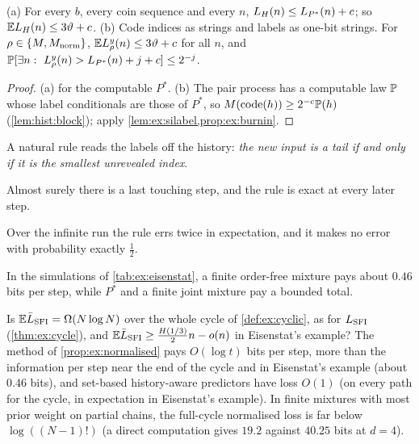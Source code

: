 \begin{theorem}\label{thm:ex:eisensi}
(a) For every $b$, every coin sequence and every $n$, $L_{H}(n)\le L_{P^*}(n)+c$; so $\mathbb{E}L_{H}(n)\le3\vartheta+c$.
(b) Code indices as strings and labels as one-bit strings. For $\rho\in\{M,M_{\mathrm{norm}}\}$, $\mathbb{E} L^y_\rho(n)\le3\vartheta+c$ for all $n$, and $\Prob[\exists n:\ L^y_\rho(n)>L_{P^*}(n)+j+c]\le2^{-j}$.
\end{theorem}

\begin{proof}
(a)  for the computable $P^*$. (b) The pair process has a computable law $\mathbb{P}$ whose label conditionals are those of $P^*$, so $M(\operatorname{code}(h))\ge2^{-c}\mathbb{P}(h)$ (\cref{lem:hist:block}); apply \cref{lem:ex:silabel,prop:ex:burnin}.
\end{proof}

A natural rule reads the labels off the history: \emph{the new input is a tail if and only if it is the smallest unrevealed index}.

\begin{corollary}\label{cor:ex:rule}
Almost surely there is a last touching step, and the rule is exact at every later step.
\end{corollary}

\begin{proposition}\label{prop:ex:rulestats}
Over the infinite run the rule errs twice in expectation, and it makes no error with probability exactly $\frac12$.
\end{proposition}

In the simulations of \cref{tab:ex:eisenstat}, a finite order-free mixture pays about $0.46$ bits per step, while $P^*$ and a finite joint mixture pay a bounded total.

\begin{question}\label{q:ex:normalised}
Is $\mathbb{E}\bar{L}_{\mathrm{SFI}}=\Omega(N\log N)$ over the whole cycle of \cref{def:ex:cyclic}, as for $L_{\mathrm{SFI}}$ (\cref{thm:ex:cycle}), and $\mathbb{E}\bar{L}_{\mathrm{SFI}}\ge\frac{H(1/3)}2n-o(n)$ in Eisenstat's example? The method of \cref{prop:ex:normalised} pays $O(\log t)$ bits per step, more than the information per step near the end of the cycle and in Eisenstat's example (about $0.46$ bits), and set-based history-aware predictors have loss $O(1)$ (on every path for the cycle, in expectation in Eisenstat's example). In finite mixtures with most prior weight on partial chains, the full-cycle normalised loss is far below $\log((N-1)!)$ (a direct computation gives $19.2$ against $40.25$ bits at $d=4$).
\end{question}

